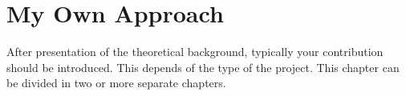 

\chapter{My Own Approach} 

After presentation of the theoretical background, typically  your
contribution should be introduced. This depends of the type of the
project. This chapter can be divided in two or more separate
chapters.


